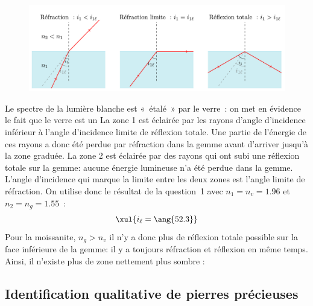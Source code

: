 \documentclass[a4paper, 10pt, garamond, oneside]{book}
\begin{document}
{\begin{enumerate}
		      \begin{figure}[htbp!]
			      \centering
			      \includegraphics[width=.7\linewidth]{refraction_limite}
			      \label{fig:reflim}
		      \end{figure}
     Le spectre de la lumière blanche est «~étalé~» par le verre~: on met
		      en évidence le fait que le verre est un 
     La zone 1 est éclairée par les rayons d'angle d'incidence inférieur à
		      l'angle d'incidence limite de réflexion totale. Une partie de
		      l'énergie de ces rayons a donc été perdue par réfraction dans la gemme
		      avant d'arriver jusqu'à la zone graduée. La zone 2 est éclairée par
		      des rayons qui ont subi une réflexion totale sur la gemme: aucune
		      énergie lumineuse n'a été perdue dans la gemme.
		      \smallbreak
     L'angle d'incidence qui marque la limite entre les deux zones est
		      l'angle limite de réfraction. On utilise donc le résultat de la
		      question~1 avec $n_1=n_v=\num{1.96}$ et $n_2=n_g=\num{1.55}$~:
		      \[
			      \xul{i_\ell=\ang{52.3}}
		      \]
     Pour la moissanite, $n_g>n_v$ il n'y a donc plus de réflexion totale
		      possible sur la face inférieure de la gemme: il y a toujours
		      réfraction et réflexion en même temps. Ainsi, il n'existe plus de zone
		      nettement plus sombre : 
	\end{enumerate}
}

\subsection{Identification qualitative de pierres précieuses}


\end{document}
